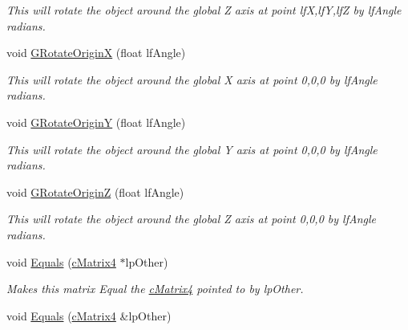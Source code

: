 \begin{DoxyCompactItemize}
\begin{DoxyCompactList}\small\item\em This will rotate the object around the global Z axis at point lfX,lfY,lfZ by lfAngle radians. \end{DoxyCompactList}\item 
\hypertarget{classc_matrix4_a3ddcb503ea46911e194a9b881a6f0bee}{
void \hyperlink{classc_matrix4_a3ddcb503ea46911e194a9b881a6f0bee}{GRotateOriginX} (float lfAngle)}
\label{classc_matrix4_a3ddcb503ea46911e194a9b881a6f0bee}

\begin{DoxyCompactList}\small\item\em This will rotate the object around the global X axis at point 0,0,0 by lfAngle radians. \end{DoxyCompactList}\item 
\hypertarget{classc_matrix4_abe68a204b91201b33adc32f5b354631e}{
void \hyperlink{classc_matrix4_abe68a204b91201b33adc32f5b354631e}{GRotateOriginY} (float lfAngle)}
\label{classc_matrix4_abe68a204b91201b33adc32f5b354631e}

\begin{DoxyCompactList}\small\item\em This will rotate the object around the global Y axis at point 0,0,0 by lfAngle radians. \end{DoxyCompactList}\item 
\hypertarget{classc_matrix4_af5ecfcfab719acf23ddb1148ad24825a}{
void \hyperlink{classc_matrix4_af5ecfcfab719acf23ddb1148ad24825a}{GRotateOriginZ} (float lfAngle)}
\label{classc_matrix4_af5ecfcfab719acf23ddb1148ad24825a}

\begin{DoxyCompactList}\small\item\em This will rotate the object around the global Z axis at point 0,0,0 by lfAngle radians. \end{DoxyCompactList}\item 
\hypertarget{classc_matrix4_a943edd1e04048bd2bcb93987a6c47819}{
void \hyperlink{classc_matrix4_a943edd1e04048bd2bcb93987a6c47819}{Equals} (\hyperlink{classc_matrix4}{cMatrix4} $\ast$lpOther)}
\label{classc_matrix4_a943edd1e04048bd2bcb93987a6c47819}

\begin{DoxyCompactList}\small\item\em Makes this matrix Equal the \hyperlink{classc_matrix4}{cMatrix4} pointed to by lpOther. \end{DoxyCompactList}\item 
\hypertarget{classc_matrix4_a2b04c467006fe476d6f2e5efc61b3ead}{
void \hyperlink{classc_matrix4_a2b04c467006fe476d6f2e5efc61b3ead}{Equals} (\hyperlink{classc_matrix4}{cMatrix4} \&lpOther)}
\label{classc_matrix4_a2b04c467006fe476d6f2e5efc61b3ead}


\end{DoxyCompactItemize}
